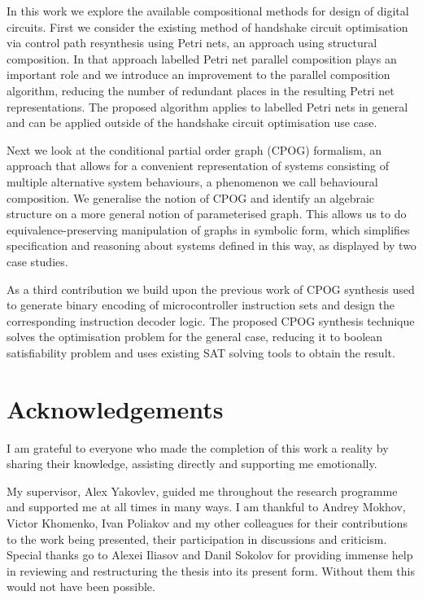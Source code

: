 \documentclass[12pt,english,british]{report}
\begin{document}
\tableofcontents

\listoffigures
\listoftables

\abstract
 
In this work we explore the available compositional methods for design of digital circuits.
First we consider the existing method of handshake circuit optimisation via control path 
resynthesis using Petri nets, an approach using structural composition. 
In that approach labelled Petri net parallel composition plays an important role
and we introduce an improvement to the parallel composition algorithm, reducing the number of redundant places in 
the resulting Petri net representations. The proposed algorithm applies to labelled Petri nets in general
and can be applied outside of the handshake circuit optimisation use case.

Next we look at the conditional partial order graph (CPOG) formalism, an approach that allows for a convenient representation of systems
consisting of multiple alternative system behaviours, a phenomenon we call behavioural composition.
We generalise the notion of CPOG and identify an algebraic structure on a more general notion of parameterised graph.
This allows us to do equivalence-preserving manipulation of graphs in symbolic form, which simplifies
specification and reasoning about systems defined in this way, as displayed by two case studies.

As a third contribution we build upon the previous work of CPOG synthesis used 
to generate binary encoding of microcontroller instruction sets and design the corresponding instruction decoder logic. 
The proposed CPOG synthesis technique solves the optimisation problem for the
general case, reducing it to boolean satisfiability problem and uses existing 
SAT solving tools to obtain the result.


\chapter*{Acknowledgements}

I am grateful to everyone who made the completion of this work a reality by sharing their knowledge, assisting directly and supporting me emotionally.

My supervisor, Alex Yakovlev, guided me throughout the research programme and supported me at all times in many ways.
I am thankful to Andrey Mokhov, Victor Khomenko, Ivan Poliakov and my other colleagues for their contributions
to the work being presented, their participation in discussions and criticism.
Special thanks go to Alexei Iliasov and Danil Sokolov for providing immense help in reviewing 
and restructuring the thesis into its present form. Without them this would not have been possible.
\end{document}
